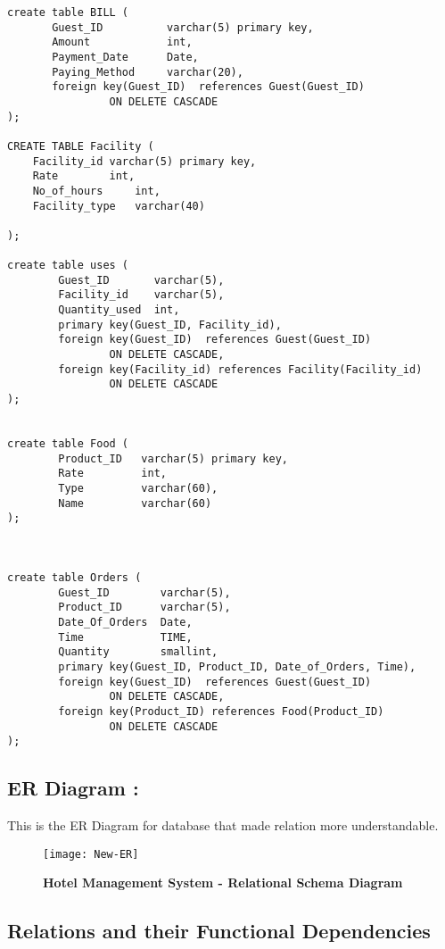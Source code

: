 \documentclass[a4,12pt]{report}
\begin{document}
\begin{lstlisting}
create table BILL (
       Guest_ID          varchar(5) primary key,
       Amount            int,
       Payment_Date      Date,
       Paying_Method     varchar(20),
       foreign key(Guest_ID)  references Guest(Guest_ID)
                ON DELETE CASCADE
);

CREATE TABLE Facility (
	Facility_id	varchar(5) primary key,
	Rate		int,
	No_of_hours     int,
	Facility_type	varchar(40)
   
);

create table uses (
        Guest_ID       varchar(5),
        Facility_id    varchar(5),
        Quantity_used  int,
        primary key(Guest_ID, Facility_id),
        foreign key(Guest_ID)  references Guest(Guest_ID)
                ON DELETE CASCADE,     
        foreign key(Facility_id) references Facility(Facility_id)
                ON DELETE CASCADE
);

        
create table Food (
        Product_ID   varchar(5) primary key, 
        Rate         int,
        Type         varchar(60),
        Name         varchar(60)
);



create table Orders (
        Guest_ID        varchar(5),
        Product_ID      varchar(5),
        Date_Of_Orders  Date,
        Time            TIME,
        Quantity        smallint,
        primary key(Guest_ID, Product_ID, Date_of_Orders, Time),
        foreign key(Guest_ID)  references Guest(Guest_ID)
                ON DELETE CASCADE,     
        foreign key(Product_ID) references Food(Product_ID)
                ON DELETE CASCADE
);
\end{lstlisting}

\subsection*{ER Diagram :} This is the ER Diagram for database that made relation more understandable.\\
\begin{figure}[hbtp]
\centering
\texttt{[image: New-ER]} \\

\caption{\textbf{{\color{red}Hotel Management System - Relational Schema Diagram}}}
\end{figure}

\newpage
\subsection*{Relations and their Functional Dependencies}
\end{document}
